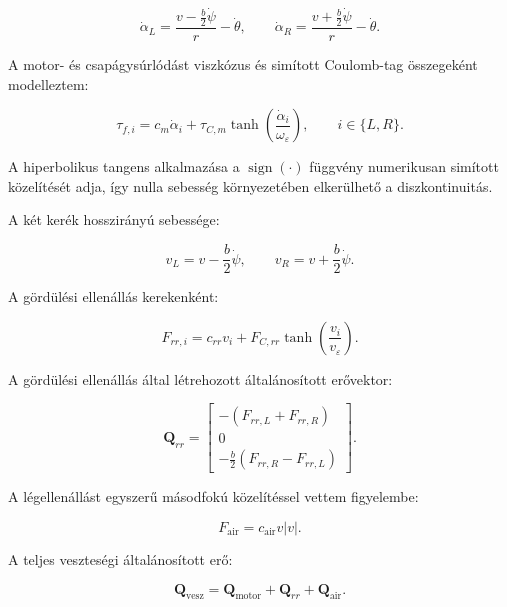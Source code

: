\documentclass[12pt,a4paper]{report}
\begin{document}
	\begin{equation}
		\dot{\alpha}_L
		=
		\frac{v-\frac{b}{2}\dot{\psi}}{r}
		-\dot{\theta},
		\qquad
		\dot{\alpha}_R
		=
		\frac{v+\frac{b}{2}\dot{\psi}}{r}
		-\dot{\theta}.
	\end{equation}
	
	A motor- és csapágysúrlódást viszkózus és simított Coulomb-tag
	összegeként modelleztem:
	
	\begin{equation}
		\tau_{f,i}
		=
		c_m \dot{\alpha}_i
		+
		\tau_{C,m}
		\tanh
		\left(
		\frac{\dot{\alpha}_i}{\omega_\varepsilon}
		\right),
		\qquad i\in\{L,R\}.
	\end{equation}
	
	A hiperbolikus tangens alkalmazása a
	$\operatorname{sign}(\cdot)$ függvény numerikusan simított
	közelítését adja, így nulla sebesség környezetében elkerülhető a
	diszkontinuitás.
	
	A két kerék hosszirányú sebessége:
	
	\begin{equation}
		v_L=v-\frac{b}{2}\dot{\psi},
		\qquad
		v_R=v+\frac{b}{2}\dot{\psi}.
	\end{equation}
	
	A gördülési ellenállás kerekenként:
	
	\begin{equation}
		F_{rr,i}
		=
		c_{rr}v_i
		+
		F_{C,rr}
		\tanh
		\left(
		\frac{v_i}{v_\varepsilon}
		\right).
	\end{equation}
	
	A gördülési ellenállás által létrehozott általánosított erővektor:
	
	\begin{equation}
		\mathbf{Q}_{rr}
		=
		\begin{bmatrix}
			-(F_{rr,L}+F_{rr,R})\\
			0\\
			-\frac{b}{2}(F_{rr,R}-F_{rr,L})
		\end{bmatrix}.
	\end{equation}
	
	A légellenállást egyszerű másodfokú közelítéssel vettem figyelembe:
	
	\begin{equation}
		F_{\mathrm{air}}
		=
		c_{\mathrm{air}}v|v|.
	\end{equation}
	
	A teljes veszteségi általánosított erő:
	
	\begin{equation}
		\mathbf{Q}_{\mathrm{vesz}}
		=
		\mathbf{Q}_{\mathrm{motor}}
		+
		\mathbf{Q}_{rr}
		+
		\mathbf{Q}_{\mathrm{air}}.
	\end{equation}
	
\end{document}
